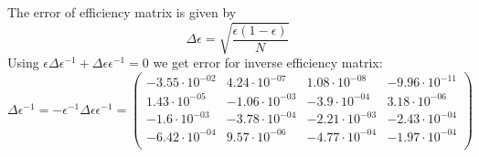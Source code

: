 \documentclass[]{article}
\begin{document}
The error of efficiency matrix is given by
\begin{equation}
\Delta \epsilon = \sqrt{\frac{\epsilon(1-\epsilon)}{N}}
\end{equation}
Using $\epsilon\Delta\epsilon^{-1}+\Delta\epsilon\epsilon^{-1}=0$ we get error for inverse efficiency matrix:
\begin{equation}
\Delta\epsilon^{-1} = -\epsilon^{-1}\Delta\epsilon\epsilon^{-1} = \begin{pmatrix}
   -3.55 \cdot 10^{-02} & 4.24 \cdot 10^{-07} & 1.08 \cdot 10^{-08} & -9.96 \cdot 10^{-11} \\
   1.43 \cdot 10^{-05} & -1.06 \cdot 10^{-03} & -3.9 \cdot 10^{-04} & 3.18 \cdot 10^{-06} \\
   -1.6 \cdot 10^{-03} & -3.78 \cdot 10^{-04} & -2.21 \cdot 10^{-03} & -2.43 \cdot 10^{-04} \\
   -6.42 \cdot 10^{-04} & 9.57 \cdot 10^{-06} & -4.77 \cdot 10^{-04} & -1.97 \cdot 10^{-04} \\
\end{pmatrix}
\end{equation}
\end{document}
